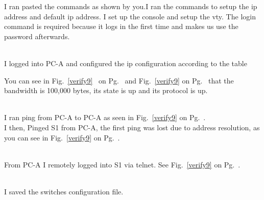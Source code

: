 \documentclass[../EngineeringJournal_CDavis.tex]{subfiles}
\begin{document}
\clearpage




I ran pasted the commands as shown by you.I ran the commands to setup the ip 
address and default ip address. I set up the console and setup the vty. 
The login command is required because it logs in
the first time and makes us use the password afterwards.
\hfill\break

\noindent{}
\\I logged into PC-A and configured the ip configuration according to the table


You can see in Fig.~\ref{verify9}~ 
on Pg.~\pageref{verify9} and Fig.~\ref{verify9} on
Pg.~\pageref{verify9} that the bandwidth is 100,000 bytes,  its state is up and
its protocol is up.
\hfill\break

\noindent{}
\\I ran ping from PC-A to PC-A as seen in
Fig.~\ref{verify9} on Pg.~\pageref{verify9}.
\\I then, Pinged S1 from PC-A, the first ping was lost due to address
resolution, as you can see in Fig.~\ref{verify9} on
Pg.~\pageref{verify9}.
\hfill\break

\noindent{}
\\From PC-A I remotely logged into S1 via telnet. See
Fig.~\ref{verify9} on Pg.~\pageref{verify9}.
\hfill\break

\noindent{}
\\I saved the switches configuration file.
\end{document}

